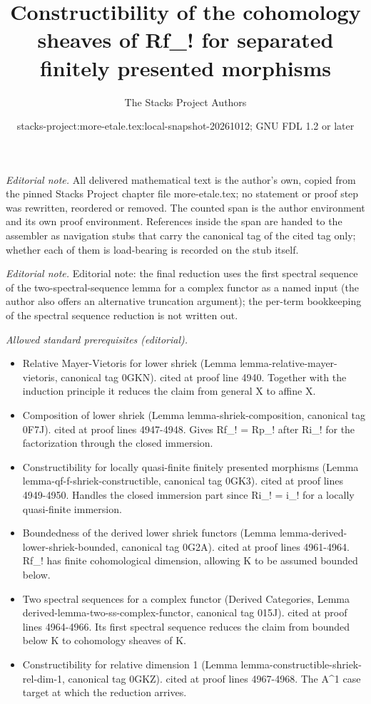 \documentclass{stacks-project}
\title{Constructibility of the cohomology sheaves of Rf\_! for separated finitely presented morphisms}
\author{The Stacks Project Authors}
\date{stacks-project:more-etale.tex:local-snapshot-20261012; GNU FDL 1.2 or later}
\theoremstyle{plain}
\theoremstyle{definition}
\theoremstyle{remark}
\numberwithin{equation}{subsection}
\begin{document}
\maketitle
\setcounter{subsection}{1}
\noindent\textit{Editorial note.} All delivered mathematical text is the author's own, copied from the pinned Stacks Project chapter file more-etale.tex; no statement or proof step was rewritten, reordered or removed. The counted span is the author environment and its own proof environment. References inside the span are handed to the assembler as navigation stubs that carry the canonical tag of the cited tag only; whether each of them is load-bearing is recorded on the stub itself.\par\medskip
\noindent\textit{Editorial note.} Editorial note: the final reduction uses the first spectral sequence of the two-spectral-sequence lemma for a complex functor as a named input (the author also offers an alternative truncation argument); the per-term bookkeeping of the spectral sequence reduction is not written out.\par\medskip
\noindent\textit{Allowed standard prerequisites (editorial).}\begin{itemize}
\item Relative Mayer-Vietoris for lower shriek (Lemma lemma-relative-mayer-vietoris, canonical tag 0GKN). cited at proof line 4940. Together with the induction principle it reduces the claim from general X to affine X.
\item Composition of lower shriek (Lemma lemma-shriek-composition, canonical tag 0F7J). cited at proof lines 4947-4948. Gives Rf\_! = Rp\_! after Ri\_! for the factorization through the closed immersion.
\item Constructibility for locally quasi-finite finitely presented morphisms (Lemma lemma-qf-f-shriek-constructible, canonical tag 0GK3). cited at proof lines 4949-4950. Handles the closed immersion part since Ri\_! = i\_! for a locally quasi-finite immersion.
\item Boundedness of the derived lower shriek functors (Lemma lemma-derived-lower-shriek-bounded, canonical tag 0G2A). cited at proof lines 4961-4964. Rf\_! has finite cohomological dimension, allowing K to be assumed bounded below.
\item Two spectral sequences for a complex functor (Derived Categories, Lemma derived-lemma-two-ss-complex-functor, canonical tag 015J). cited at proof lines 4964-4966. Its first spectral sequence reduces the claim from bounded below K to cohomology sheaves of K.
\item Constructibility for relative dimension 1 (Lemma lemma-constructible-shriek-rel-dim-1, canonical tag 0GKZ). cited at proof lines 4967-4968. The A\textasciicircum{}1 case target at which the reduction arrives.
\end{itemize}\medskip
\end{document}
